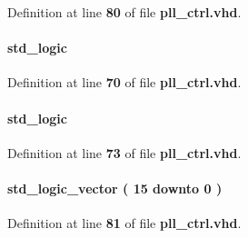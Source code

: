 Definition at line {\bf 80} of file {\bf pll\+\_\+ctrl.\+vhd}.

\paragraph[{c3\+\_\+odddiv}]{ {\bfseries \textcolor{comment}{std\+\_\+logic}\textcolor{vhdlchar}{ }} \hspace{0.3cm}{\ttfamily [Signal]}}\label{classpll__ctrl_1_1arch_a2ab4bd5b63f8176ef8007016d42f81d6}


Definition at line {\bf 70} of file {\bf pll\+\_\+ctrl.\+vhd}.

\paragraph[{c4\+\_\+byp}]{ {\bfseries \textcolor{comment}{std\+\_\+logic}\textcolor{vhdlchar}{ }} \hspace{0.3cm}{\ttfamily [Signal]}}\label{classpll__ctrl_1_1arch_a4621ebdbe293e46a6005616ae8ddd355}


Definition at line {\bf 73} of file {\bf pll\+\_\+ctrl.\+vhd}.

\paragraph[{c4\+\_\+cnt}]{ {\bfseries \textcolor{comment}{std\+\_\+logic\+\_\+vector}\textcolor{vhdlchar}{ }\textcolor{vhdlchar}{(}\textcolor{vhdlchar}{ }\textcolor{vhdlchar}{ } \textcolor{vhdldigit}{15} \textcolor{vhdlchar}{ }\textcolor{keywordflow}{downto}\textcolor{vhdlchar}{ }\textcolor{vhdlchar}{ } \textcolor{vhdldigit}{0} \textcolor{vhdlchar}{ }\textcolor{vhdlchar}{)}\textcolor{vhdlchar}{ }} \hspace{0.3cm}{\ttfamily [Signal]}}\label{classpll__ctrl_1_1arch_a5f2a8d0dbb015734e8bf57774f23553b}


Definition at line {\bf 81} of file {\bf pll\+\_\+ctrl.\+vhd}.


